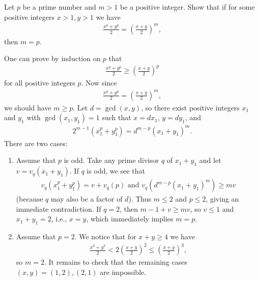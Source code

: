 \documentclass[main.tex]{subfile}
\begin{document}
    \begin{problem}[Balkan 1993]
        Let $p$ be a prime number and $m>1$ be a positive integer. Show that if for some positive integers $x>1, y>1$ we have
        \begin{align*}
	        \frac{x^p+y^p}{2}= \left( \frac{x+y}{2} \right)^m,
        \end{align*}
        then $m=p.$
    \end{problem}

    \begin{solution}
        One can prove by induction on $p$ that
        	\begin{align*}
        		\frac{x^p+y^p}2\ge \left(\frac{x+y}2\right)^p
        	\end{align*}
        for all positive integers $p$. Now since
        	\begin{align*}
        		\frac{x^p+y^p}{2}= \left( \frac{x+y}{2} \right)^m,
        	\end{align*}
        we should have $ m \geq p$. Let $d=\gcd(x,y)$, so there exist positive integers
        $x_1$ and $y_1$ with $\gcd(x_1,y_1)=1$ such that $x=dx_1$, $y=dy_1$, and
        	\begin{align*}
        		2^{m-1}(x_1^p+y_1^p)=d^{m-p}(x_1+y_1)^m.
        	\end{align*}
        There are two cases:
        
        \begin{enumerate}
        	\item Assume that $p$ is odd. Take any prime divisor $q$ of $x_1+y_1$ and let $v=v_q(x_1+y_1)$. If $q$ is odd, we see that
        		\begin{align*}
        			v_q(x_1^p +y_1^p)=v+v_q(p) \text{ and } v_q(d^{m-p}(x_1+y_1)^m) \geq mv
        		\end{align*}
        	(because $q$  may also be a factor of $d$). 
        	Thus $m\le 2$ and $p\le 2$, giving an immediate contradiction. If $q=2$, then $m-1+v\ge mv$, so $v\le 1$ and $x_1+y_1=2$, i.e., $x=y$, which immediately implies $m=p$.
        	
        	\item Assume that $p=2$. We notice that for $x+y \geq 4$ we have
        		\begin{align*}
        			\frac{x^2+y^2}2< 2\left(\frac{x+y}2\right)^2\le \left(\frac{x+y}2\right)^3,
        		\end{align*}
        	so $m=2$. It remains to check that the remaining cases $(x,y)=(1,2),(2,1)$ are impossible.
        \end{enumerate}
    
    \end{solution}
\end{document}
